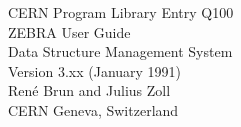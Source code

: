 \newenvironment{UL}{%
\begin{list}{}
   {\setlength{\labelsep}{0pt}%
    \setlength{\itemsep}{0pt}%
    \setlength{\parsep}{0pt}%
    \setlength{\topsep}{0pt}%
    \renewcommand{\makelabel}{\hfill$\bullet$\hskip6pt}}}%
{\end{list}}
\makeindex
\parindent=0pt

\begin{titlepage}
\begin{center}CERN Program Library Entry Q100\\[5cm]
{\Huge ZEBRA User Guide}\\[1cm]
{\LARGE Data Structure Management System}\\[1cm]
{\LARGE Version 3.xx (January 1991)}\\[4cm]
Ren\'e Brun and Julius Zoll\\[4cm]
CERN Geneva, Switzerland
\end{center}\end{titlepage}
\thispagestyle{empty}
